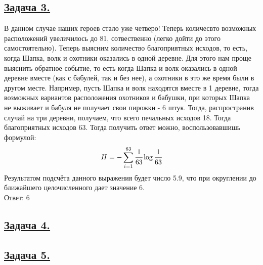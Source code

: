 \subsection*{\hyperref[sec:problem3]{Задача 3.}}
\label{sec:sol_problem3}
В данном случае наших героев стало уже четверо! Теперь количесвто возможных расположений увеличилось до 81, сотвественно (легко дойти до этого самостоятельно). Теперь выясним количество благоприятных исходов, то есть, когда Шапка, волк и охотники оказались в одной деревне. Для этого нам проще выяснить обратное событие, то есть когда Шапка и волк оказались в одной деревне вместе (как с бабулей, так и без нее), а охотники в это же время были в другом месте. Например, пусть Шапка и волк находятся вместе в 1 деревне, тогда возможных вариантов расположения охотников и бабушки, при которых Шапка не выживает и бабуля не получает свои пирожки - 6 штук. Тогда, распространив случай  на три деревни, получаем, что всего печальных исходов 18. Тогда благоприятных исходов 63. Тогда получить ответ можно, воспользовавшишь формулой: 
\[H=-\sum\limits_{i=1}^{63}  \cfrac{1}{63}\log \cfrac{1}{63} \]
Результатом подсчёта данного выражения будет число 5.9, что при округлении до ближайшего целочисленного дает значение 6. \\

Ответ: 6
\subsection*{\hyperref[sec:problem4]{Задача 4.}}
\label{sec:sol_problem4}

\subsection*{\hyperref[sec:problem5]{Задача 5.}}
\label{sec:sol_problem5}